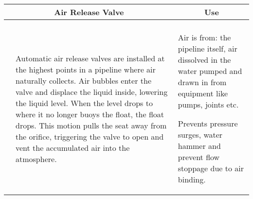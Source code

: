 \begin{landscape}
\begin{table}[h!]
\begin{tabular}{| m{7cm} m{10cm} | m{7cm} | }
    \\ \hline
\multicolumn{2}{c}{\scriptsize{Air Release Valve}} & \multicolumn{1}{c}{\scriptsize{Use}} \\ \hline
    \begin{minipage}{.3\textwidth}
   \vspace{-0.5em} 
     \texttt{[image: AirReleaseValve3.png]}\\
    \end{minipage}
    &
  \scriptsize{Automatic air release valves are installed at the highest points in a pipeline where air naturally collects. Air bubbles enter the valve and displace the liquid inside, lowering the liquid level. When the level drops to where it no longer buoys the float, the float drops. This motion pulls the seat away from the orifice, triggering the valve to open and vent the accumulated air into the atmosphere.
}  
    &
        \vspace{0.4cm}
      \begin{itemize}[leftmargin=*]
      \scriptsize{
        \item Air is from: the pipeline itself,  air dissolved in the water pumped and drawn in from equipment like pumps, joints etc. \item Prevents pressure surges, water hammer and prevent flow stoppage due to air binding.}
      \end{itemize}
  

\end{tabular}
\end{table}
\end{landscape}
